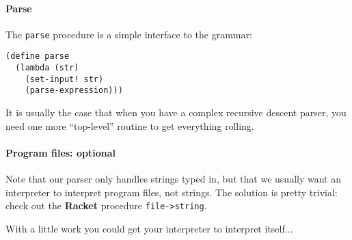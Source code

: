 \documentclass{article}
\begin{document}
\paragraph{Parse}
The {\tt parse} procedure is a simple interface to the grammar:
\begin{Verbatim}[frame=single]
(define parse
  (lambda (str)
    (set-input! str)
    (parse-expression)))
\end{Verbatim}
It is usually the case that when you have a complex recursive descent
parser, you need one more ``top-level'' routine to get everything
rolling. 

\paragraph{Program files: optional}

Note that our parser only handles strings typed in, but that we
usually want an interpreter to interpret program files, not strings.
The solution is pretty trivial:
check out the {\bf Racket} procedure {\tt file->string}.

With a little work you could get your interpreter to interpret itself...
\end{document}
